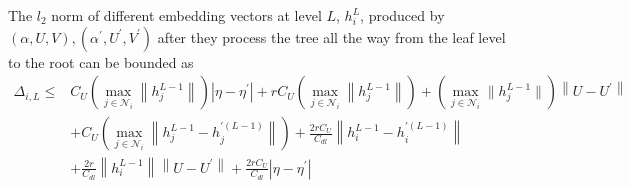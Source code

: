 \begin{lemma}
The $l_2$ norm of different embedding vectors at level $L$, $h_i^L$, produced by $(\alpha, U, V), (\alpha^\prime, U^\prime, V^\prime)$ after they process the tree all the way from the leaf level to the root can be bounded as
\begin{align*}
    \Delta_{i,L} 
    \leq & 
    C_U \left(\max_{j \in \mathcal{N}_i} \left\|h_j^{L-1}\right\|\right) |\eta - \eta^\prime|
    +  rC_U \left(\max_{j \in \mathcal{N}_i} \left\|h_j^{L-1}\right\|\right)
    + \left(\max_{j \in \mathcal{N}_i}\|h_j^{L-1}\|\right) \left\|U - U^{\prime}\right\| \\
    &+ C_U \left(\max_{j \in \mathcal{N}_i}\left\|h_j^{L-1} - h_j^{\prime (L-1)}\right\|\right)
    + \frac{2rC_U}{C_{dl}}\left\|h_i^{L-1} - h_i^{\prime (L-1)}\right\|\\
    &+ \frac{2r}{C_{dl}} \left\|h_i^{L-1}\right\| \left\|U - U^{\prime}\right\| + \frac{2rC_U}{C_{dl}}\left|\eta - \eta^\prime\right|
\end{align*}
\end{lemma}
